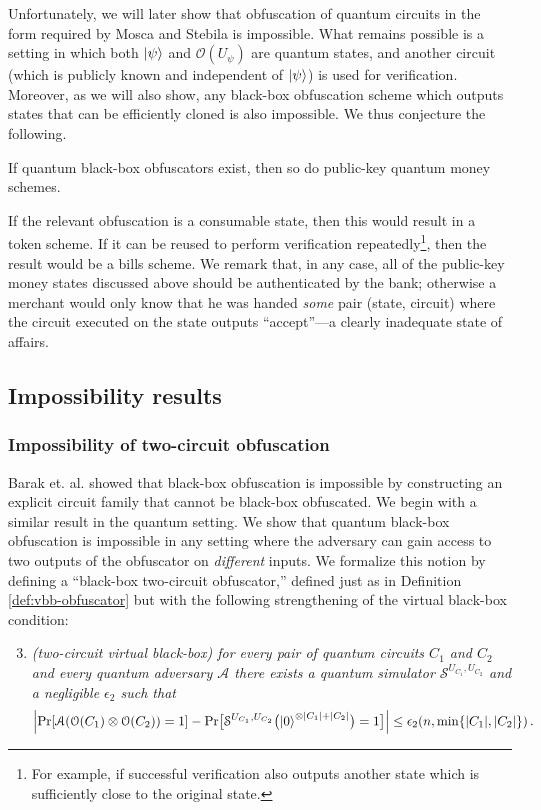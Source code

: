 \documentclass[envcountsame]{llncs}
\numberwithin{equation}{section}
\begin{document}
Unfortunately, we will later show that obfuscation of quantum circuits in the form required by Mosca and Stebila is impossible. What remains possible is a setting in which both ${\left\vert{\psi}\right\rangle}$ and $\mathcal O(U_\psi)$ are quantum states, and another circuit (which is publicly known and independent of ${\left\vert{\psi}\right\rangle}$) is used for verification. Moreover, as we will also show, any black-box obfuscation scheme which outputs states that can be efficiently cloned is also impossible. We thus conjecture the following.
\begin{conjecture}
If quantum black-box obfuscators exist, then so do public-key quantum money schemes.
\end{conjecture}
If the relevant obfuscation is a consumable state, then this would result in a token scheme. If it can be reused to perform verification repeatedly\footnote{For example, if successful verification also outputs another state which is sufficiently close to the original state.}, then the result would be a bills scheme. We remark that, in any case, all of the public-key money states discussed above should be authenticated by the bank; otherwise a merchant would only know that he was handed \emph{some} pair (state, circuit) where the circuit executed on the state outputs ``accept''---a clearly inadequate state of affairs.

\subsection{Impossibility results}\label{vbb:impossibility}

\subsubsection{Impossibility of two-circuit obfuscation}\label{sec-twocircuit}
Barak et. al. \cite{BGIRSVY12} showed that black-box obfuscation is impossible by constructing an explicit circuit family that cannot be black-box obfuscated. 
We begin with a similar result in the quantum setting. We show that quantum black-box obfuscation is impossible in any setting where the adversary can gain access to two outputs of the obfuscator on \emph{different} inputs. We formalize this notion by defining a ``black-box two-circuit obfuscator,''  defined just as in Definition \ref{def:vbb-obfuscator} but with the following strengthening of the virtual black-box condition:
\begin{enumerate}
\setcounter{enumi}{2}
\item \emph{(two-circuit virtual black-box) for every pair of quantum circuits $C_1$ and $C_2$ and every quantum adversary $\mathcal A$ there exists a quantum simulator $\mathcal S^{U_{C_1}, U_{C_2}}$ and a negligible $\epsilon_2$ such that}
$$
\Bigl| \text{Pr}[\mathcal A(\mathcal O(C_1) \otimes \mathcal O(C_2)) = 1] - \text{Pr}\bigl[\mathcal S^{U_{C_1}, U_{C_2}}\bigl({\left\vert{0}\right\rangle}^{\otimes |C_1| + |C_2|}\bigr) = 1\bigr] \Bigr| \leq \epsilon_2(n, \min\{|C_1|,|C_2|\})\,.
$$
\end{enumerate}
\end{document}
